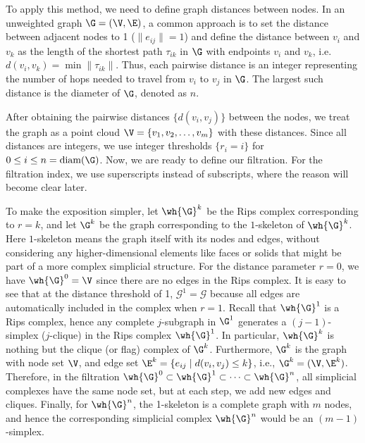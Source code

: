 To apply this method, we need to define graph distances between nodes. In an unweighted graph $\G = (\V, \E)$, a common approach is to set the distance between adjacent nodes to 1 ($\|e_{ij}\| = 1$) and define the distance between $v_i$ and $v_k$ as the length of the shortest path $\tau_{ik}$ in $\G$ with endpoints $v_i$ and $v_k$, i.e. $d(v_i, v_k) = \min \|\tau_{ik}\|$. Thus, each pairwise distance is an integer representing the number of hops needed to travel from $v_i$ to $v_j$ in $\G$. The largest such distance is the diameter of $\G$, denoted as $n$.

After obtaining the pairwise distances $\{d(v_i, v_j)\}$ between the nodes, we treat the graph as a point cloud $\V = \{v_1, v_2, \dots, v_m\}$ with these distances. Since all distances are integers, we use integer thresholds $\{r_i = i\}$ for $0 \leq i \leq n = \text{diam}(\G)$. Now, we are ready to define our filtration. For the filtration index, we use superscripts instead of subscripts, where the reason will become clear later. 




To make the exposition simpler, let $\wh{\G}^k$ be the Rips complex corresponding to $r=k$, and let $\G^k$ be the graph corresponding to the $1$-skeleton of $\wh{\G}^k$. Here $1$-skeleton means the graph itself with its nodes and edges, without considering any higher-dimensional elements like faces or solids that might be part of a more complex simplicial structure. For the distance parameter $r = 0$, we have $\wh{\G}^0 = \V$ since there are no edges in the Rips complex. It is easy to see that at the distance threshold of 1, $\mathcal{G}^1 = \mathcal{G}$ because all edges are automatically included in the complex when $r = 1$. Recall that $\wh{\G}^1$ is a Rips complex, hence any complete $j$-subgraph in $\G^1$ generates a $(j-1)$-simplex ($j$-clique) in the Rips complex $\wh{\G}^1$. In particular, $\wh{\G}^k$ is nothing but the clique (or flag) complex of $\G^k$. Furthermore, $\G^k$ is the graph with node set $\V$, and edge set $\E^k = \{e_{ij} \mid d(v_i, v_j) \leq k\}$, i.e., $\G^k=(\V,\E^k)$. Therefore, in the filtration $\wh{\G}^0 \subset \wh{\G}^1 \subset \dots \subset \wh{\G}^n$, all simplicial complexes have the same node set, but at each step, we add new edges and cliques. Finally, for $\wh{\G}^n$, the 1-skeleton is a complete graph with $m$ nodes, and hence the corresponding simplicial complex $\wh{\G}^n$ would be an $(m-1)$-simplex. 

